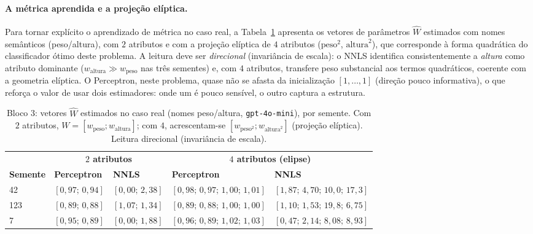 \documentclass[12pt,a4paper]{article}
\newcommand{\West}{\ensuremath{\hat{W}}}   %
\begin{document}
\paragraph{A métrica aprendida e a projeção elíptica.}
Para tornar explícito o aprendizado de métrica no caso real, a
Tabela~\ref{tab:real_w} apresenta os vetores de parâmetros \West{} estimados com nomes
semânticos (peso/altura), com $2$ atributos e com a projeção elíptica de $4$ atributos
($\text{peso}^2$, $\text{altura}^2$), que corresponde à forma quadrática do classificador
ótimo deste problema. A leitura deve ser \emph{direcional} (invariância de escala): o NNLS
identifica consistentemente a \emph{altura} como atributo dominante ($w_{\text{altura}}
\gg w_{\text{peso}}$ nas três sementes) e, com $4$ atributos, transfere peso substancial
aos termos quadráticos, coerente com a geometria elíptica. O Perceptron, neste problema,
quase não se afasta da inicialização $[1,\ldots,1]$ (direção pouco informativa), o que
reforça o valor de usar dois estimadores: onde um é pouco sensível, o outro captura a
estrutura.

\begin{table}[ht]
\centering
\caption{Bloco 3: vetores \West{} estimados no caso real (nomes peso/altura,
\texttt{gpt-4o-mini}), por semente. Com $2$ atributos, $W = [w_{\text{peso}};
w_{\text{altura}}]$; com $4$, acrescentam-se $[w_{\text{peso}^2}; w_{\text{altura}^2}]$
(projeção elíptica). Leitura direcional (invariância de escala).}
\label{tab:real_w}
\footnotesize
\setlength{\tabcolsep}{4pt}
\begin{tabular}{lllll}
\toprule
& \multicolumn{2}{c}{\textbf{$2$ atributos}} & \multicolumn{2}{c}{\textbf{$4$ atributos
(elipse)}} \\
\cmidrule(lr){2-3}\cmidrule(lr){4-5}
\textbf{Semente} & \textbf{Perceptron} & \textbf{NNLS} & \textbf{Perceptron} &
\textbf{NNLS} \\
\midrule
42  & $[0{,}97;\,0{,}94]$ & $[0{,}00;\,2{,}38]$ & $[0{,}98;\,0{,}97;\,1{,}00;\,1{,}01]$ &
$[1{,}87;\,4{,}70;\,10{,}0;\,17{,}3]$ \\
123 & $[0{,}89;\,0{,}88]$ & $[1{,}07;\,1{,}34]$ & $[0{,}89;\,0{,}88;\,1{,}00;\,1{,}00]$ &
$[1{,}10;\,1{,}53;\,19{,}8;\,6{,}75]$ \\
7   & $[0{,}95;\,0{,}89]$ & $[0{,}00;\,1{,}88]$ & $[0{,}96;\,0{,}89;\,1{,}02;\,1{,}03]$ &
$[0{,}47;\,2{,}14;\,8{,}08;\,8{,}93]$ \\
\bottomrule
\end{tabular}
\end{table}
\end{document}
